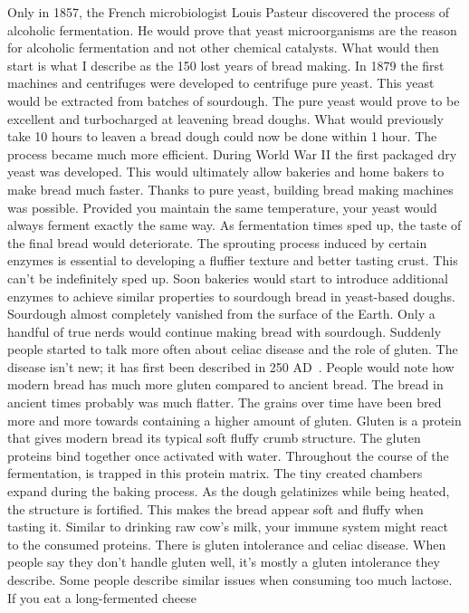 Only in 1857, the French microbiologist Louis Pasteur discovered
the process of alcoholic fermentation. He would prove that
yeast microorganisms are the reason for alcoholic fermentation
and not other chemical catalysts. What would then start is
what I describe as the 150 lost years of bread making. In 1879
the first machines and centrifuges were developed to centrifuge
pure yeast. This yeast would be extracted from batches of sourdough.
The pure yeast would prove to be excellent and turbocharged
at leavening bread doughs. What would previously take 10 hours
to leaven a bread dough could now be done within 1 hour.
The process became much more efficient. During World War II
the first packaged dry yeast was developed. This would ultimately
allow bakeries and home bakers to make bread much faster.
Thanks to pure yeast, building bread making machines was
possible. Provided you maintain the same temperature,
your yeast would always ferment exactly the same way. As fermentation
times sped up, the taste of the final bread would deteriorate.
The sprouting process induced by certain enzymes is essential
to developing a fluffier texture and better tasting crust. This
can't be indefinitely sped up. Soon bakeries would start
to introduce additional enzymes to achieve similar properties
to sourdough bread in yeast-based doughs. Sourdough almost completely
vanished from the surface of the Earth. Only a handful
of true nerds would continue making bread with sourdough.
Suddenly people started to talk more often about celiac disease
and the role of gluten. The disease isn't new; it has first
been described in 250 AD~\cite{coeliac+disease}. People
would note how modern bread has much more gluten compared
to ancient bread. The bread in ancient times probably was much flatter.
The grains over time have been bred more and more towards containing a higher
amount of gluten. Gluten is a protein that gives modern
bread its typical soft fluffy crumb structure. The
gluten proteins bind together once activated with water.
Throughout the course of the fermentation,  is trapped
in this protein matrix. The tiny created chambers expand
during the baking process. As the dough gelatinizes while
being heated, the structure is fortified. This makes the bread appear
soft and fluffy when tasting it. Similar to drinking raw cow's milk,
your immune system might react to the consumed proteins.
There is gluten intolerance
and celiac disease. When people say they don't handle
gluten well, it's mostly a gluten intolerance they describe.
Some people describe similar issues when consuming
too much lactose. If you eat a long-fermented cheese
